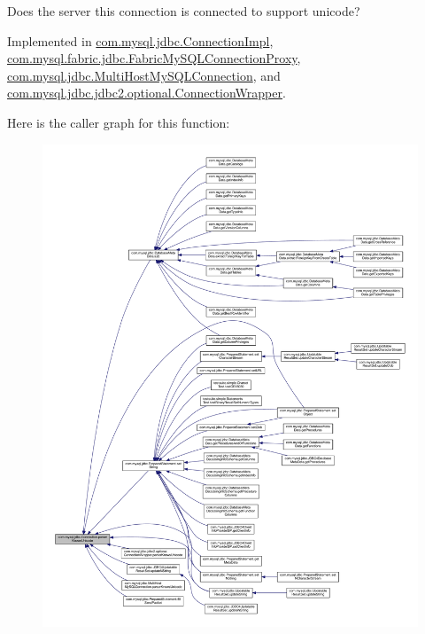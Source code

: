 Does the server this connection is connected to support unicode? 

Implemented in \mbox{\hyperlink{classcom_1_1mysql_1_1jdbc_1_1_connection_impl_a7aebd878f6c8a52c2d2ea690734e681f}{com.\+mysql.\+jdbc.\+Connection\+Impl}}, \mbox{\hyperlink{classcom_1_1mysql_1_1fabric_1_1jdbc_1_1_fabric_my_s_q_l_connection_proxy_a7129c03a6bf6bd8dfc5ec91f0b868dc9}{com.\+mysql.\+fabric.\+jdbc.\+Fabric\+My\+S\+Q\+L\+Connection\+Proxy}}, \mbox{\hyperlink{classcom_1_1mysql_1_1jdbc_1_1_multi_host_my_s_q_l_connection_a3a325a2e459d6fcda172893f843c390d}{com.\+mysql.\+jdbc.\+Multi\+Host\+My\+S\+Q\+L\+Connection}}, and \mbox{\hyperlink{classcom_1_1mysql_1_1jdbc_1_1jdbc2_1_1optional_1_1_connection_wrapper_a8e5f44787d05899d25927db0d43179e2}{com.\+mysql.\+jdbc.\+jdbc2.\+optional.\+Connection\+Wrapper}}.

Here is the caller graph for this function\+:\nopagebreak
\begin{figure}[H]
\begin{center}
\leavevmode
\includegraphics[width=350pt]{interfacecom_1_1mysql_1_1jdbc_1_1_connection_a09e06dca89e57de8d11e9e9ff2d78f4d_icgraph}
\end{center}
\end{figure}
\mbox{\label{interfacecom_1_1mysql_1_1jdbc_1_1_connection_a65a9bf75714ed318b0324f99dfa09761}} 
